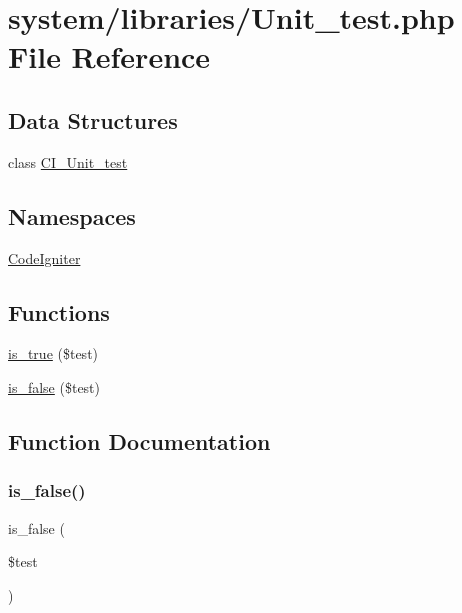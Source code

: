 \hypertarget{_unit__test_8php}{}\section{system/libraries/\+Unit\+\_\+test.php File Reference}
\label{_unit__test_8php}
\subsection*{Data Structures}
\begin{DoxyCompactItemize}
\item 
class \mbox{\hyperlink{class_c_i___unit__test}{C\+I\+\_\+\+Unit\+\_\+test}}
\end{DoxyCompactItemize}
\subsection*{Namespaces}
\begin{DoxyCompactItemize}
\item 
 \mbox{\hyperlink{namespace_code_igniter}{Code\+Igniter}}
\end{DoxyCompactItemize}
\subsection*{Functions}
\begin{DoxyCompactItemize}
\item 
\mbox{\hyperlink{_unit__test_8php_acf75638429e85f5d2eb23c85ce46f85b}{is\+\_\+true}} (\$test)
\item 
\mbox{\hyperlink{_unit__test_8php_a2fdef4e023452d31fcf5b3085bc9b25f}{is\+\_\+false}} (\$test)
\end{DoxyCompactItemize}


\subsection{Function Documentation}
\mbox{\label{_unit__test_8php_a2fdef4e023452d31fcf5b3085bc9b25f}} 
\subsubsection{\texorpdfstring{is\_false()}{is\_false()}}
{\footnotesize\ttfamily is\+\_\+false (\begin{DoxyParamCaption}\item[{}]{\$test }\end{DoxyParamCaption})}

